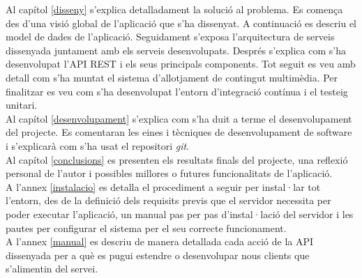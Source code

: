 Al capítol \ref{disseny} s'explica detalladament la solució al problema. Es comença des d'una visió global de l'aplicació que s'ha dissenyat. A continuació es descriu el model de dades de l'aplicació. Seguidament s'exposa l'arquitectura de serveis dissenyada juntament amb els serveis desenvolupats. Després s'explica com s'ha desenvolupat l'\ac{API} \ac{REST} i els seus principals components. Tot seguit es veu amb detall com s'ha muntat el sistema d'allotjament de contingut multimèdia. Per finalitzar es veu com s'ha desenvolupat l'entorn d'integració contínua i el testeig unitari.\\

Al capítol \ref{desenvolupament} s'explica com s'ha duit a terme el desenvolupament del projecte. Es comentaran les eines i tècniques de desenvolupament de software i s'explicarà com s'ha usat el repositori \emph{git}.\\

Al capítol \ref{conclusions} es presenten els resultats finals del projecte, una reflexió personal de l'autor i possibles millores o futures funcionalitats de l'aplicació. \\

A l'annex \ref{instalacio} es detalla el procediment a seguir per instal·lar tot l'entorn, des de la definició dels requisits previs que el servidor necessita per poder executar l'aplicació, un manual pas per pas d'instal·lació del servidor i les pautes per configurar el sistema per el seu correcte funcionament.\\

A l'annex \ref{manual} es descriu de manera detallada cada acció de la API dissenyada per a què es pugui estendre o desenvolupar nous clients que s'alimentin del servei. \\

